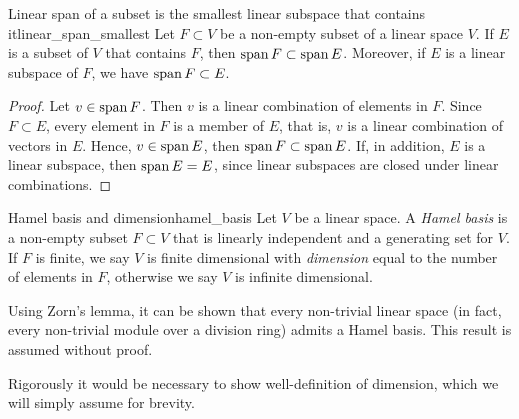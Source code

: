 \begin{proposition}{Linear span of a subset is the smallest linear subspace that contains it}{linear_span_smallest}
    Let \(F \subset V\) be a non-empty subset of a linear space \(V\). If \(E\) is a subset of \(V\) that contains \(F\), then \(\operatorname{span}{F} \subset \operatorname{span}{E}\). Moreover, if \(E\) is a linear subspace of \(F\), we have \(\operatorname{span}{F} \subset E\).
\end{proposition}
\begin{proof}
    Let \(v \in \operatorname{span}{F}\). Then \(v\) is a linear combination of elements in \(F\). Since \(F \subset E\), every element in \(F\) is a member of \(E\), that is, \(v\) is a linear combination of vectors in \(E\). Hence, \(v \in \operatorname{span}{E}\), then \(\operatorname{span}{F} \subset \operatorname{span}{E}\). If, in addition, \(E\) is a linear subspace, then \(\operatorname{span}{E} = E\), since linear subspaces are closed under linear combinations.
\end{proof}

\begin{definition}{Hamel basis and dimension}{hamel_basis}
    Let \(V\) be a linear space. A \emph{Hamel basis} is a non-empty subset \(F\subset V\) that is linearly independent and a generating set for \(V\). If \(F\) is finite, we say \(V\) is finite dimensional with \emph{dimension} equal to the number of elements in \(F\), otherwise we say \(V\) is infinite dimensional.
\end{definition}
\begin{remark}
    Using Zorn's lemma, it can be shown that every non-trivial linear space (in fact, every non-trivial module over a division ring) admits a Hamel basis. This result is assumed without proof.
\end{remark}
\begin{remark}
    Rigorously it would be necessary to show well-definition of dimension, which we will simply assume for brevity.
\end{remark}


